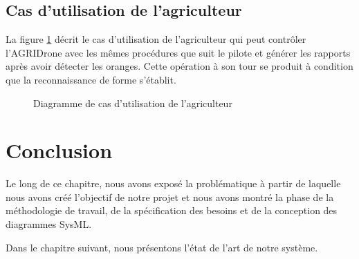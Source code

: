 		\subsection{Cas d'utilisation de l'agriculteur }
		La figure \ref{fig:D.A} décrit le cas d'utilisation de l'agriculteur qui peut contrôler l'AGRIDrone avec les mêmes procédures que suit le pilote et générer les rapports après avoir détecter les oranges. Cette opération à son tour se produit à condition que la reconnaissance de forme s'établit. 
		\begin{figure}[H] 
			\begin{center} 
				\centering
				\hspace*{0cm}	
			\end{center}
			
			\caption{\label{fig:D.A}Diagramme de cas d'utilisation de l'agriculteur}	
			
			\end {figure}
			
			\section*{Conclusion}
			Le long de ce chapitre, nous avons exposé la problématique à partir de laquelle nous avons créé l'objectif de notre projet et nous avons montré la phase de la méthodologie de travail, de la spécification des besoins et de la conception des diagrammes SysML.
			
			Dans le chapitre suivant, nous présentons l'état de l'art de notre système.
			
			
